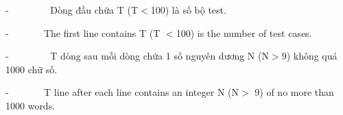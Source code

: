 -         Dòng đầu chứa T (T$<$100) là số bộ test.    

-         The first line contains T (T $<$100) is the number of test cases.

-         T dòng sau mỗi dòng chứa 1 số nguyên dương N (N$>$9) không quá 1000 chữ số.

-         T line after each line contains an integer N (N$>$ 9) of no more than 1000 words.